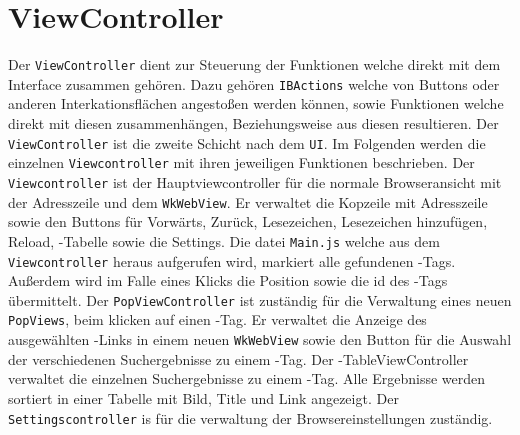 
\section{ViewController}
Der \lstinline|ViewController| dient zur Steuerung der Funktionen welche direkt mit dem Interface zusammen gehören. Dazu gehören
\lstinline|IBActions| welche von Buttons oder anderen Interkationsflächen angestoßen werden können, sowie Funktionen welche direkt mit diesen zusammenhängen, Beziehungsweise aus diesen resultieren. Der \lstinline|ViewController| ist die zweite Schicht nach dem \lstinline|UI|. Im
Folgenden werden die einzelnen \lstinline|Viewcontroller| mit ihren jeweiligen Funktionen beschrieben.
Der \lstinline|Viewcontroller| ist der Hauptviewcontroller für die normale Browseransicht mit der Adresszeile und dem \lstinline|WkWebView|. Er verwaltet die Kopzeile mit Adresszeile sowie den Buttons für Vorwärts, Zurück, Lesezeichen, Lesezeichen hinzufügen, Reload, \SECH-Tabelle sowie die Settings. Die datei \lstinline|Main.js| welche aus dem \lstinline|Viewcontroller| heraus aufgerufen wird, markiert alle gefundenen \SEARCH-Tags. Außerdem wird im Falle eines Klicks die Position sowie die id des \SEARCH-Tags übermittelt.
Der \lstinline|PopViewController| ist zuständig für die Verwaltung eines neuen \lstinline|PopViews|, beim klicken auf einen \SEARCH-Tag. Er verwaltet die Anzeige des ausgewählten \Search-Links in einem neuen \lstinline|WkWebView| sowie den Button für die Auswahl der verschiedenen Suchergebnisse zu einem \Search-Tag.
Der \Search-TableViewController verwaltet die einzelnen Suchergebnisse zu einem \Search-Tag. Alle Ergebnisse werden sortiert in einer Tabelle mit Bild, Title und Link angezeigt.
Der \lstinline|Settingscontroller| is für die verwaltung der Browsereinstellungen zuständig.


